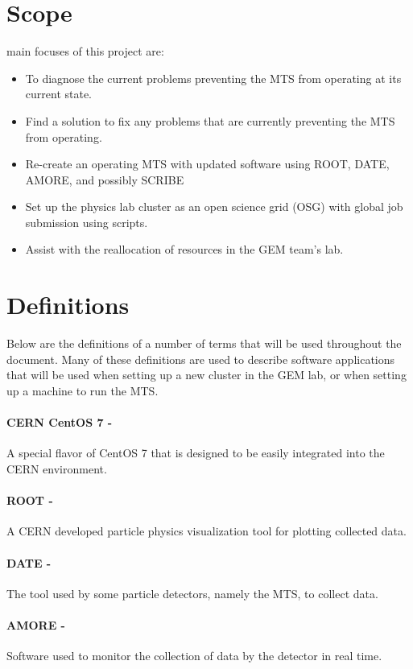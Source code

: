 \documentclass[12pt]{article}
\newcommand\tab[1][1cm]{\hspace*{#1}}
\begin{document}
\section*{Scope} %
main focuses of this project are:
\begin{itemize}
	\item To diagnose the current problems preventing the MTS from operating
at its current state.
	\item Find a solution to fix any problems that are currently preventing
the MTS from operating.
	\item Re-create an operating MTS with updated software using ROOT, DATE,
AMORE, and possibly SCRIBE
	\item Set up the physics lab cluster as an open science grid (OSG) with
global job submission using scripts.
	\item Assist with the reallocation of resources in the GEM team’s lab. 
\end{itemize}

\section*{Definitions}
%
\tab Below are the definitions of a number of terms that will be used throughout the document. Many of these definitions are used to describe software applications that will be used when setting up a new cluster in the GEM lab, or when setting up a machine to run the MTS.
\paragraph{CERN CentOS 7 -}A special flavor of CentOS 7 that is designed to be easily integrated into the CERN environment.
\paragraph{ROOT -}A CERN developed particle physics visualization tool for plotting collected data.
\paragraph{DATE -}The tool used by some particle detectors, namely the MTS, to collect data.
\paragraph{AMORE -} Software used to monitor the collection of data by the detector in real time.
\end{document}
